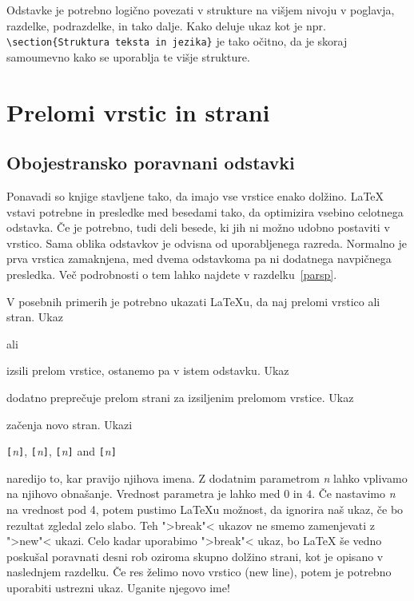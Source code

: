 Odstavke je potrebno logično povezati v strukture na višjem nivoju v 
poglavja, razdelke, podrazdelke, in tako dalje. Kako deluje ukaz kot je npr.{} 
\verb|\section{|\texttt{Struktura teksta in jezika}\verb|}| je tako očitno,
da je skoraj samoumevno kako se uporablja te višje strukture.


\section{Prelomi vrstic in strani}
 
\subsection{Obojestransko poravnani odstavki}

Ponavadi so knjige stavljene tako, da imajo vse vrstice enako dolžino.
\LaTeX{} vstavi potrebne  in presledke med besedami 
tako, da optimizira vsebino celotnega odstavka. Če je potrebno, tudi deli
besede, ki jih ni možno udobno postaviti v vrstico.
Sama oblika odstavkov je odvisna od uporabljenega razreda.
Normalno je prva vrstica zamaknjena, med dvema odstavkoma pa ni dodatnega navpičnega 
presledka. 
Več podrobnosti o tem lahko najdete v razdelku~\ref{parsp}.

V posebnih primerih je potrebno ukazati \LaTeX{}u, da naj prelomi vrstico ali stran. Ukaz 
\begin{lscommand}
\ci{\bs} ali  
\end{lscommand}
\noindent izsili prelom vrstice, ostanemo pa v istem odstavku. Ukaz
\begin{lscommand}
\ci{\bs*}
\end{lscommand}
\noindent dodatno preprečuje prelom strani za izsiljenim prelomom vrstice. Ukaz
\begin{lscommand}
\end{lscommand}
\noindent začenja novo stran. Ukazi
\begin{lscommand}
\verb|[|\emph{n}\verb|]|,
\verb|[|\emph{n}\verb|]|, 
\verb|[|\emph{n}\verb|]| and
\verb|[|\emph{n}\verb|]|
\end{lscommand}
\noindent naredijo to, kar pravijo njihova imena. Z dodatnim parametrom \emph{n} lahko vplivamo 
na njihovo obnašanje. Vrednost parametra je lahko med $0$ in $4$. 
Če nastavimo \emph{n} na vrednost pod 4, potem pustimo 
\LaTeX{}u možnost, da ignorira naš ukaz, če bo rezultat zgledal zelo slabo.
Teh ">break"< ukazov ne smemo zamenjevati z ">new"< ukazi. Celo kadar uporabimo
">break"< ukaz, bo \LaTeX{} še vedno poskušal poravnati desni rob oziroma skupno dolžino strani, kot je 
opisano v naslednjem razdelku. Če res želimo novo vrstico (new line), potem je potrebno 
uporabiti ustrezni ukaz. Uganite njegovo ime!


